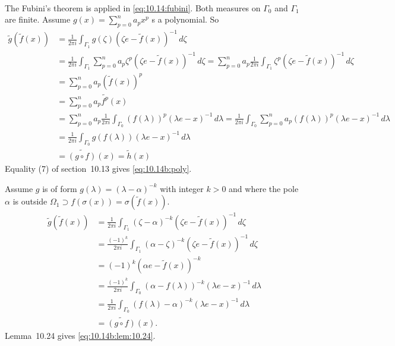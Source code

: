 \begin{enumerate}
\begin{itemize}
\begin{align}
\end{align}
The Fubini's theorem is applied in \eqref{eq:10.14:fubini}.
Both measures on \(\Gamma_0\) and \(\Gamma_1\) are finite.
Assume
\(g(x) = \sum_{p=0}^n a_p x^p\) s a polynomial. So
\begin{align}
\widetilde{g}\left(\widetilde{f}(x)\right)
  &= \frac{1}{2\pi i}\int_{\Gamma_1}
    g(\zeta)\left(\zeta e - \widetilde{f}(x)\right)^{-1}\,d\zeta \nonumber \\
  &=  \frac{1}{2\pi i}\int_{\Gamma_1}
        \sum_{p=0}^n
        a_p \zeta^p \left(\zeta e - \widetilde{f}(x)\right)^{-1}\,d\zeta
          \nonumber
   =  \sum_{p=0}^n
        a_p
        \frac{1}{2\pi i}
        \int_{\Gamma_1}
          \zeta^p \left(\zeta e - \widetilde{f}(x)\right)^{-1}\,d\zeta
            \nonumber \\
  &= \sum_{p=0}^n a_p \left(\widetilde{f}(x)\right)^p \label{eq:10.14b:poly} \\
  &= \sum_{p=0}^n a_p \widetilde{f^p}(x) \nonumber \\
  &= \sum_{p=0}^n a_p
    \frac{1}{2\pi i}
    \int_{\Gamma_0}
    (f(\lambda))^p(\lambda e - x)^{-1}\,d\lambda 
  = \frac{1}{2\pi i}\int_{\Gamma_0}
    \sum_{p=0}^n a_p(f(\lambda))^p(\lambda e - x)^{-1}\,d\lambda \nonumber \\
  &= \frac{1}{2\pi i}\int_{\Gamma_0} g(f(\lambda))(\lambda e - x)^{-1}\,d\lambda
    \nonumber \\
  &= \widetilde{(g\circ f)}(x) = \widetilde{h}(x) \nonumber
\end{align}
Equality (7) of section~10.13 gives \eqref{eq:10.14b:poly}.

Assume $g$ is of form \(g(\lambda) = (\lambda - \alpha)^{-k}\)
with integer \(k>0\) and where the pole \(\alpha\) is
outside
\(\Omega_1 \supset f(\sigma(x)) = \sigma\left(\widetilde{f}(x)\right)\).
\begin{align}
\widetilde{g}\left(\widetilde{f}(x)\right)
  &= \frac{1}{2\pi i}
     \int_{\Gamma_1}
       (\zeta - \alpha)^{-k}\left(\zeta e - \widetilde{f}(x)\right)^{-1}\,d\zeta
     \nonumber \\
  &= \frac{(-1)^k}{2\pi i}
     \int_{\Gamma_1}
       (\alpha - \zeta)^{-k}\left(\zeta e - \widetilde{f}(x)\right)^{-1}\,d\zeta
     \nonumber \\
  &= (-1)^k(\alpha e -  \widetilde{f}(x))^{-k} \label{eq:10.14b:lem:10.24} \\
  &= \frac{(-1)^k}{2\pi i}\int_{\Gamma_0}
    (\alpha - f(\lambda))^{-k}(\lambda e - x)^{-1}\,d\lambda \nonumber \\
  &= \frac{1}{2\pi i}\int_{\Gamma_0}
    (f(\lambda) - \alpha)^{-k}(\lambda e - x)^{-1}\,d\lambda \nonumber \\
  &= \widetilde{(g \circ f)}(x). \nonumber
\end{align}
Lemma~10.24 gives \eqref{eq:10.14b:lem:10.24}.


\end{itemize}
\end{enumerate}

